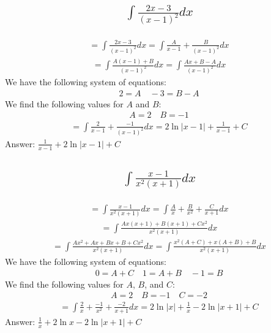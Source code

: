 \documentclass{article}
\begin{document}
\subsection{
	\begin{align*}
		\int{\frac{2x - 3}{(x - 1)^2} dx}
	\end{align*}
}
\begin{align*}
	= \int{\frac{2x - 3}{(x - 1)^2}dx} = \int{\frac{A}{x - 1} + \frac{B}{(x - 1)^2}dx}
\end{align*}
\begin{align*}
	= \int{\frac{A(x - 1) + B}{(x - 1)^2}dx} = \int{\frac{Ax + B - A}{(x - 1)^2}dx}
\end{align*}
We have the following system of equations:
\begin{align*}
	2 = A \quad -3 = B - A
\end{align*}
We find the following values for $A$ and $B$:
\begin{align*}
	A = 2 \quad B = -1
\end{align*}
\begin{align*}
	= \int{\frac{2}{x - 1} + \frac{-1}{(x - 1)^2}dx} = 2\ln{|x - 1|} + \frac{1}{x - 1} + C
\end{align*}
Answer: $\frac{1}{x - 1} + 2 \ln{|x - 1|} + C$

\subsection{
	\begin{align*}
		\int{\frac{x - 1}{x^2 (x + 1)} dx}
	\end{align*}
}
\begin{align*}
	= \int{\frac{x - 1}{x^2 (x + 1)}dx} = \int{\frac{A}{x} + \frac{B}{x^2} + \frac{C}{x + 1}dx}
\end{align*}
\begin{align*}
	= \int{\frac{Ax(x + 1) + B(x + 1) + Cx^2}{x^2(x + 1)}dx}
\end{align*}
\begin{align*}
	= \int{\frac{Ax^2 + Ax + Bx + B + Cx^2}{x^2 (x + 1)}dx} = \int{\frac{x^2(A + C) + x(A + B) + B}{x^2(x + 1)}dx}
\end{align*}
We have the following system of equations:
\begin{align*}
	0 = A + C \quad 1 = A + B \quad -1 = B
\end{align*}
We find the following values for $A$, $B$, and $C$: 
\begin{align*}
	A = 2 \quad B = -1 \quad C = -2
\end{align*}
\begin{align*}
	= \int{\frac{2}{x} + \frac{-1}{x^2} + \frac{-2}{x + 1}dx} = 2\ln{|x|} + \frac{1}{x} -2 \ln{|x + 1|} + C
\end{align*}
Answer: $\frac{1}{x} + 2 \ln{x} - 2 \ln{|x + 1|} + C$
\end{document}
